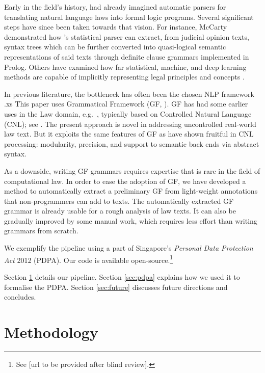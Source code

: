 \documentclass{IOS-Book-Article}
\begin{document}
Early in the field's history, \cite{bing_designing_1987} had already imagined automatic parsers for translating natural language laws into formal logic programs. Several significant steps have since been taken towards that vision. For instance, McCarty \cite{mccarty_deep_2007} demonstrated how \cite{collins_head-driven_2003}'s statistical parser can extract, from judicial opinion texts, syntax trees which can be further converted into quasi-logical semantic representations of said texts through definite clause grammars implemented in Prolog. Others have examined how far statistical, machine, and deep learning methods are capable of implicitly representing legal principles and concepts \cite{groendijk_neural_1992, de_maat_automatic_2008, winkels_automatic_2012, chalkidis_neural_2019, chalkidis_lexglue_2022}.

In previous literature, the bottleneck has often been the chosen NLP framework \cite{quaresma_question_2005,wyner_study_2013}.xs
This paper uses Grammatical Framework (GF, \cite{ranta-2011}).
GF has had some earlier uses in the Law domain, e.g.\  \cite{angelov-al-2013,gdpr-2018}, typically based on Controlled Natural Language (CNL); see \cite{fuchs-al-2008,angelov-ranta-2009}.
The present approach is novel in addressing uncontrolled real-world law text.
But it exploits the same features of GF as have shown fruitful in CNL processing: modularity, precision, and support to semantic back ends via abstract syntax.
 
As a downside, writing GF grammars requires expertise that is rare in the field of computational law.
In order to ease the adoption of GF, we have developed a method to automatically extract a preliminary GF from light-weight annotations that non-programmers can add to texts.
The automatically extracted GF grammar is already usable for a rough analysis of law texts.
It can also be gradually improved by some manual work, which requires less effort than writing grammars from scratch.

We exemplify the pipeline using a part of Singapore's \textit{Personal Data Protection Act} 2012 (PDPA). Our code is available open-source.\footnote{See [url to be provided after blind review].}

Section \ref{sec:methods} details our pipeline. Section \ref{sec:pdpa} explains how we used it to formalise the PDPA. Section \ref{sec:future} discusses future directions and concludes.

\section{Methodology}
\label{sec:methods}
\end{document}
